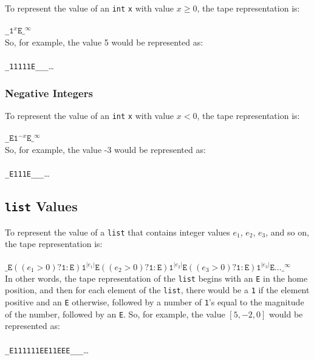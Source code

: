 \documentclass[11pt]{article}
\begin{document}
To represent the value of an \texttt{int} \texttt{x} with value $x \ge 0$, the tape representation is: \\ \\
\texttt{_}$\texttt{1}^x\texttt{E}\texttt{_}^\infty$ \\

So, for example, the value 5 would be represented as: \\ \\
\texttt{_11111E___}\dots

\subsubsection{Negative Integers}

To represent the value of an \texttt{int} \texttt{x} with value $x < 0$, the tape representation is: \\ \\
\texttt{_}$\texttt{E1}^{-x}\texttt{E_}^\infty$ \\ 

So, for example, the value -3 would be represented as: \\ \\
\texttt{_E111E___}\dots 

\subsection{\texttt{list} Values}

To represent the value of a \texttt{list} that contains integer values $e_1$, $e_2$, $e_3$, and so on, the tape representation is: \\ \\
$\texttt{_E}((e_1>0)?\texttt{1}:\texttt{E})\texttt{1}^{|e_1|}\texttt{E}((e_2>0)?\texttt{1}:\texttt{E})\texttt{1}^{|e_2|}\texttt{E}((e_3>0)?\texttt{1}:\texttt{E})\texttt{1}^{|e_3|}\texttt{E}\dots\texttt{_}^\infty$ \\

In other words, the tape representation of the \texttt{list} begins with an \texttt{E} in the home position, and then for each element of the \texttt{list}, there would be a \texttt{1} if the element positive and an \texttt{E} otherwise, followed by a number of \texttt{1}'s equal to the magnitude of the number, followed by an \texttt{E}. So, for example, the value $[5, -2, 0]$ would be represented as: \\ \\
\texttt{_E111111EE11EEE___}\dots
\end{document}
